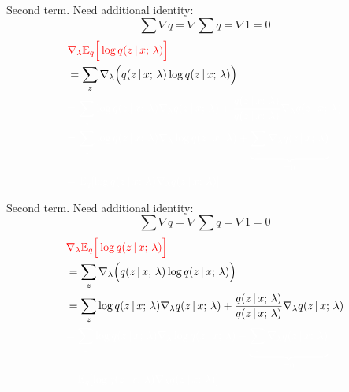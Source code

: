 \begin{frame}
Second term. Need additional identity:
\[\sum \nabla q = \nabla \sum q = \nabla 1 = 0 \]
\vspace{-5mm}
\begin{align*}
    &{\color{red} \nabla_\lambda  \E_{q}\Big[\log q(z \given x \param \lambda) \Big] }\\
    &= \sum_{z} \nabla_\lambda \Big ( q(z \given x\param \lambda) \log q(z \given x \param \lambda)\Big) \\
    &{\color{white} = \sum_{z}  \log q(z \given x \param \lambda) \nabla_\lambda q(z \given x \param \lambda) +  \frac{q(z \given x \param \lambda)}{q(z \given x \param \lambda)}\nabla_\lambda q(z \given x \param \lambda) }\\
    &{\color{white}= \sum_{z}  \log q(z \given x \param \lambda) \nabla_\lambda \log q(z \given x \param \lambda) + \underbrace{\sum_z \nabla_\lambda q(z \given x \param \lambda)}_{= 0}} \\
    &{\color{white}= \E_{q}[\log q (z \given x \param \lambda) \nabla_\lambda q (z \given x \param \lambda)]}
\end{align*}
\end{frame}

\begin{frame}
Second term. Need additional identity:
\[\sum \nabla q = \nabla \sum q = \nabla 1 = 0 \]
\vspace{-5mm}
\begin{align*}
    &{\color{red} \nabla_\lambda  \E_{q}\Big[\log q(z \given x \param \lambda) \Big] }\\
    &= \sum_{z} \nabla_\lambda \Big ( q(z \given x\param \lambda) \log q(z \given x \param \lambda)\Big) \\
    & = \sum_{z}  \log q(z \given x \param \lambda) \nabla_\lambda q(z \given x \param \lambda) +  \frac{q(z \given x \param \lambda)}{q(z \given x \param \lambda)}\nabla_\lambda q(z \given x \param \lambda) \\
    &{\color{white}= \sum_{z}  \log q(z \given x \param \lambda) \nabla_\lambda \log q(z \given x \param \lambda) + \underbrace{\sum_z \nabla_\lambda q(z \given x \param \lambda)}_{= 0}} \\
    &{\color{white}= \E_{q}[\log q (z \given x \param \lambda) \nabla_\lambda q (z \given x \param \lambda)]}
\end{align*}
\end{frame}

